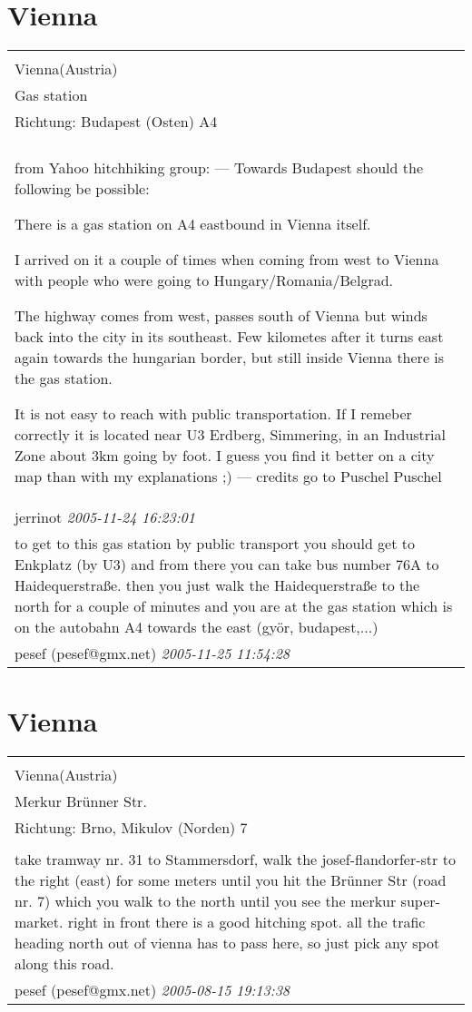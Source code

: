 \documentclass[a4paper,12pt]{article}
\begin{document}
\section{Vienna}
\begin{tabular}{|p{13cm}|}
\hline\\
Vienna(Austria)\\
Gas station\\
Richtung: Budapest (Osten) A4 \\
\hline\\
from Yahoo hitchhiking group:
---
Towards Budapest should the following be possible:

There is a gas station on A4 eastbound in Vienna itself.

I arrived on it a couple of times when coming from west to Vienna with
people who were going to Hungary/Romania/Belgrad.

The highway comes from west, passes south of Vienna but winds back into the
city in its southeast.
Few kilometes after it turns east again towards the hungarian border,
but still inside Vienna there is the gas station.

It is not easy to reach with public transportation.
If I remeber correctly it is located near U3 Erdberg, Simmering, in an
Industrial Zone about 3km going by foot.
I guess you find it better on a city map than with my explanations ;)
---
credits go to Puschel Puschel \\
jerrinot \textit{ 2005-11-24 16:23:01 }\\\hline to get to this gas station by public transport you should get to Enkplatz (by U3) and from there you can take bus number 76A to Haidequerstraße. then you just walk the Haidequerstraße to the north for a couple of minutes and you are at the gas station which is on the autobahn A4 towards the east (györ, budapest,...)
\\
pesef (pesef@gmx.net) \textit{ 2005-11-25 11:54:28 }\\\hline
\end{tabular}


\section{Vienna}
\begin{tabular}{|p{13cm}|}
\hline\\
Vienna(Austria)\\
Merkur Brünner Str.\\
Richtung: Brno, Mikulov (Norden) 7 \\
\hline\\
take tramway nr. 31 to Stammersdorf, walk the josef-flandorfer-str to the right (east) for some meters until you hit the Brünner Str (road nr. 7) which you walk to the north until you see the merkur super-market. right in front there is a good hitching spot. all the trafic heading north out of vienna has to pass here, so just pick any spot along this road. \\
pesef (pesef@gmx.net) \textit{ 2005-08-15 19:13:38 }\\\hline
\end{tabular}
\end{document}
